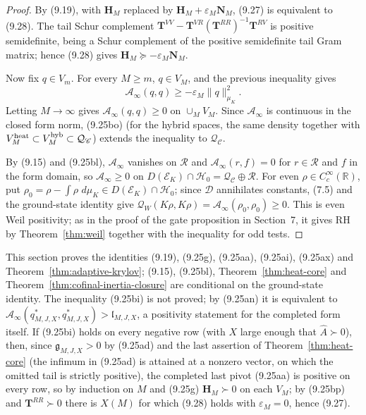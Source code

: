 \documentclass[11pt]{amsart}
\theoremstyle{definition}
\theoremstyle{remark}
\newcommand{\dd}{\,d}
\newcommand{\QW}{\mathcal Q_W}
\begin{document}
\begin{proof}
By (9.19), with \(\mathbf H_M\) replaced by
\(\mathbf H_M+\varepsilon_M\mathbf N_M\), (9.27) is equivalent to
(9.28).  The tail Schur complement
\(\mathbf T^{VV}-\mathbf T^{VR}(\mathbf T^{RR})^{-1}\mathbf T^{RV}\) is
positive semidefinite, being a Schur complement of the positive
semidefinite tail Gram matrix; hence (9.28) gives
\(\mathbf H_M\succeq-\varepsilon_M\mathbf N_M\).

Now fix \(q\in V_m\).  For every \(M\ge m\), \(q\in V_M\), and the
previous inequality gives
\[
 \mathcal A_\infty(q,q)
 \ge-\varepsilon_M\|q\|_{\mu_K}^2.
\]
Letting \(M\to\infty\) gives \(\mathcal A_\infty(q,q)\ge0\) on
\(\cup_MV_M\).  Since \(\mathcal A_\infty\) is continuous in the closed
form norm, (9.25bo) (for the hybrid spaces, the same density together
with \(V_M^{\rm heat}\subset V_M^{\rm hyb}\subset\mathcal Q_{\mathscr C}\))
extends the inequality to \(\mathcal Q_{\mathscr C}\).

By (9.15) and (9.25bl),
\(\mathcal A_\infty\) vanishes on \(\mathcal R\) and
\(\mathcal A_\infty(r,f)=0\) for \(r\in\mathcal R\) and \(f\) in the form
domain, so \(\mathcal A_\infty\ge0\) on
\(D(\mathscr E_K)\cap\mathcal H_0=\mathcal Q_{\mathscr C}\oplus
\mathcal R\).  For even \(\rho\in C_c^\infty(\mathbb R)\), put
\(\rho_0=\rho-\int\rho\,\dd\mu_K\in D(\mathscr E_K)\cap\mathcal H_0\); since
\(\mathcal D\) annihilates constants, (7.5) and the ground-state identity
give \(\QW(K\rho,K\rho)=\mathcal A_\infty(\rho_0,\rho_0)\ge0\).  This is even Weil
positivity; as in the proof of the gate proposition in Section~7, it gives
RH by Theorem~\ref{thm:weil} together with the inequality for odd tests.
\end{proof}

This section proves the identities (9.19), (9.25g), (9.25aa),
(9.25ai), (9.25ax) and Theorem~\ref{thm:adaptive-krylov}; (9.15),
(9.25bl), Theorem~\ref{thm:heat-core} and
Theorem~\ref{thm:cofinal-inertia-closure} are conditional on the
ground-state identity.  The inequality (9.25bi) is not proved; by
(9.25an) it is equivalent to
\(\mathcal A_\infty(q^*_{M,J,X},q^*_{M,J,X})>\mathfrak l_{M,J,X}\), a
positivity statement for the completed form itself.  If (9.25bi) holds
on every negative row (with \(X\) large enough that
\(\widehat A\succ0\)), then, since \(\mathfrak g_{M,J,X}>0\) by
(9.25ad) and the last assertion of Theorem~\ref{thm:heat-core} (the
infimum in (9.25ad) is attained at a nonzero vector, on which the omitted
tail is strictly positive), the completed last pivot (9.25aa) is positive on every row, so
by induction on \(M\) and (9.25g) \(\mathbf H_M\succ0\) on each \(V_M\);
by (9.25bp) and \(\mathbf T^{RR}\succ0\) there is \(X(M)\) for which
(9.28) holds with \(\varepsilon_M=0\), hence (9.27).
\end{document}

